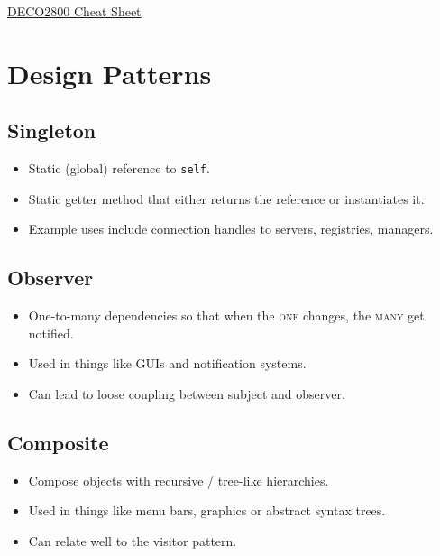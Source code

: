 \documentclass[landscape]{cheat}
\begin{document}
\footnotesize
\begin{multicols*}{3}

\begin{center}
\Large{\underline{DECO2800 Cheat Sheet}} \\
\end{center}

\section{Design Patterns}

\subsection{Singleton}
\begin{itemize}
    \item Static (global) reference to \texttt{self}.
    \item Static getter method that either returns the reference or instantiates it.
    \item Example uses include connection handles to servers, registries, managers.
\end{itemize}

\subsection{Observer}
\begin{itemize}
    \item One-to-many dependencies so that when the \textsc{one} changes, the \textsc{many} get notified.
    \item Used in things like GUIs and notification systems.
    \item Can lead to loose coupling between subject and observer.
\end{itemize}

\subsection{Composite}
\begin{itemize}
    \item Compose objects with recursive / tree-like hierarchies.
    \item Used in things like menu bars, graphics or abstract syntax trees.
    \item Can relate well to the visitor pattern.
\end{itemize}

\end{multicols*}
\end{document}
